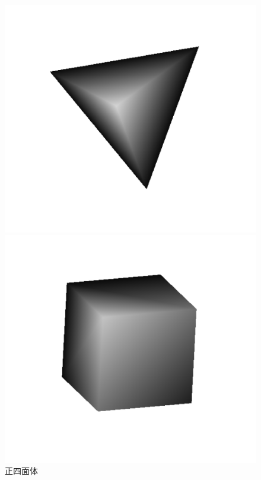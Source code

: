 \documentclass{jsarticle}
\begin{document}
        \begin{figure}[h]
            \begin{minipage}{0.33\hsize}
                \centering
                \includegraphics[width=1\hsize]{tetrahedron.png}
                \caption{正四面体}
                \label{fig:tetrahedron}
            \end{minipage}
            \begin{minipage}{0.33\hsize}
                \centering
                \includegraphics[width=1\hsize]{cube.png}

\end{minipage}
\end{figure}
\end{document}
